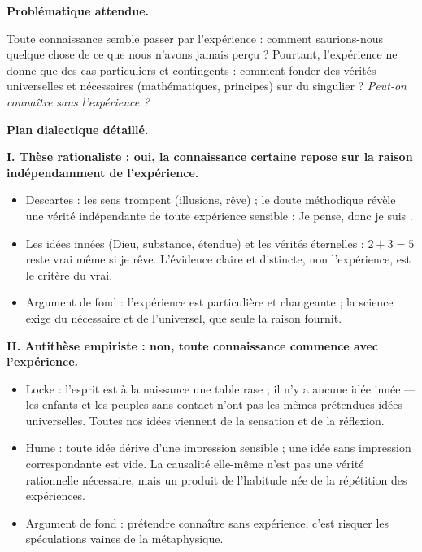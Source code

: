\documentclass[11pt]{article}
\begin{document}
\begin{corrige}

\textbf{Problématique attendue.}\par Toute connaissance semble passer par l'expérience : comment saurions-nous quelque chose de ce que nous n'avons jamais perçu ? Pourtant, l'expérience ne donne que des cas particuliers et contingents : comment fonder des vérités universelles et nécessaires (mathématiques, principes) sur du singulier ? \emph{Peut-on connaître sans l'expérience ?}

\textbf{Plan dialectique détaillé.}\par

\textbf{I. Thèse rationaliste : oui, la connaissance certaine repose sur la raison indépendamment de l'expérience.}\par
\begin{itemize}
\item Descartes : les sens trompent (illusions, rêve) ; le doute méthodique révèle une vérité indépendante de toute expérience sensible : \guillemotleft Je pense, donc je suis \guillemotright.
\item Les idées innées (Dieu, substance, étendue) et les vérités éternelles : $2 + 3 = 5$ reste vrai même si je rêve. L'évidence claire et distincte, non l'expérience, est le critère du vrai.
\item Argument de fond : l'expérience est particulière et changeante ; la science exige du nécessaire et de l'universel, que seule la raison fournit.
\end{itemize}

\textbf{II. Antithèse empiriste : non, toute connaissance commence avec l'expérience.}\par
\begin{itemize}
\item Locke : l'esprit est à la naissance une \guillemotleft table rase \guillemotright ; il n'y a aucune idée innée — les enfants et les peuples sans contact n'ont pas les mêmes prétendues idées universelles. Toutes nos idées viennent de la sensation et de la réflexion.
\item Hume : toute idée dérive d'une impression sensible ; une idée sans impression correspondante est vide. La causalité elle-même n'est pas une vérité rationnelle nécessaire, mais un produit de l'habitude née de la répétition des expériences.
\item Argument de fond : prétendre connaître sans expérience, c'est risquer les spéculations vaines de la métaphysique.
\end{itemize}


\end{corrige}
\end{document}
